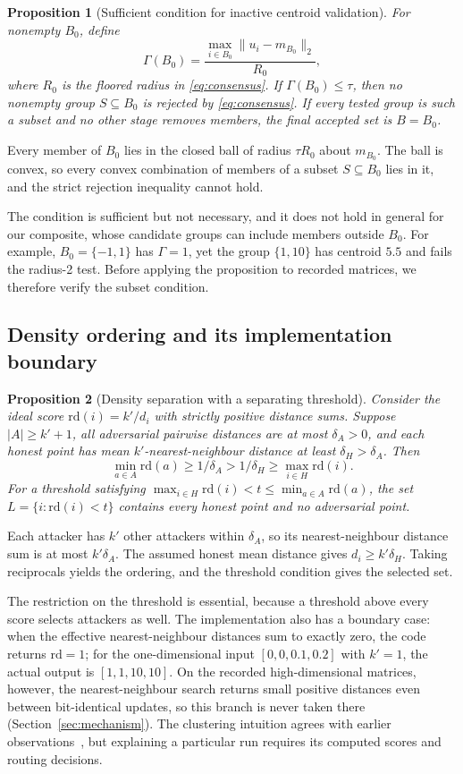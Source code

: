 \documentclass[journal]{IEEEtran}
\newtheorem{proposition}{Proposition}
\newcommand{\rd}{\mathrm{rd}}
\begin{document}
\begin{proposition}[Sufficient condition for inactive centroid validation]\label{prop:vacuity}
For nonempty $B_0$, define
\[
\Gamma(B_0)=\frac{\max_{i\in B_0}\|u_i-m_{B_0}\|_2}{R_0},
\]
where $R_0$ is the floored radius in \eqref{eq:consensus}. If $\Gamma(B_0)\leq\tau$, then no nonempty group $S\subseteq B_0$ is rejected by \eqref{eq:consensus}. If every tested group is such a subset and no other stage removes members, the final accepted set is $B=B_0$.
\end{proposition}
\begin{IEEEproof}
Every member of $B_0$ lies in the closed ball of radius $\tau R_0$ about $m_{B_0}$. The ball is convex, so every convex combination of members of a subset $S\subseteq B_0$ lies in it, and the strict rejection inequality cannot hold.
\end{IEEEproof}
The condition is sufficient but not necessary, and it does not hold in general for our composite, whose candidate groups can include members outside $B_0$. For example, $B_0=\{-1,1\}$ has $\Gamma=1$, yet the group $\{1,10\}$ has centroid $5.5$ and fails the radius-2 test. Before applying the proposition to recorded matrices, we therefore verify the subset condition.

\subsection{Density ordering and its implementation boundary}
\begin{proposition}[Density separation with a separating threshold]\label{prop:density}
Consider the ideal score $\rd(i)=k'/d_i$ with strictly positive distance sums. Suppose $|A|\geq k'+1$, all adversarial pairwise distances are at most $\delta_A>0$, and each honest point has mean $k'$-nearest-neighbour distance at least $\delta_H>\delta_A$. Then
\[
\min_{a\in A}\rd(a)\geq1/\delta_A>1/\delta_H\geq\max_{i\in H}\rd(i).
\]
For a threshold satisfying $\max_{i\in H}\rd(i)<t\leq\min_{a\in A}\rd(a)$, the set $L=\{i:\rd(i)<t\}$ contains every honest point and no adversarial point.
\end{proposition}
\begin{IEEEproof}
Each attacker has $k'$ other attackers within $\delta_A$, so its nearest-neighbour distance sum is at most $k'\delta_A$. The assumed honest mean distance gives $d_i\geq k'\delta_H$. Taking reciprocals yields the ordering, and the threshold condition gives the selected set.
\end{IEEEproof}
The restriction on the threshold is essential, because a threshold above every score selects attackers as well. The implementation also has a boundary case: when the effective nearest-neighbour distances sum to exactly zero, the code returns $\rd=1$; for the one-dimensional input $[0,0,0.1,0.2]$ with $k'=1$, the actual output is $[1,1,10,10]$. On the recorded high-dimensional matrices, however, the nearest-neighbour search returns small positive distances even between bit-identical updates, so this branch is never taken there (Section~\ref{sec:mechanism}). The clustering intuition agrees with earlier observations~\cite{bellachia2026sok}, but explaining a particular run requires its computed scores and routing decisions.
\end{document}
